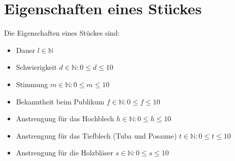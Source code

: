 \section{Eigenschaften eines Stückes}\label{sec:settings}
Die Eigenschaften eines Stückes sind:
\begin{itemize}
    \item Dauer $l \in \mathbb{N}$
    \item Schwierigkeit $ d \in \mathbb{N}: 0 \leq d \leq 10$
    \item Stimmung $ m \in \mathbb{N}: 0 \leq m \leq 10$
    \item Bekanntheit beim Publikum $ f \in \mathbb{N}: 0 \leq f \leq 10$
    \item Anstrengung für das Hochblech $ h \in \mathbb{N}: 0 \leq h \leq 10$
    \item Anstrengung für das Tiefblech (Tuba und Posaune) $ t \in \mathbb{N}: 0 \leq t \leq 10$
    \item Anstrengung für die Holzbläser $ s \in \mathbb{N}: 0 \leq s \leq 10$
\end{itemize}